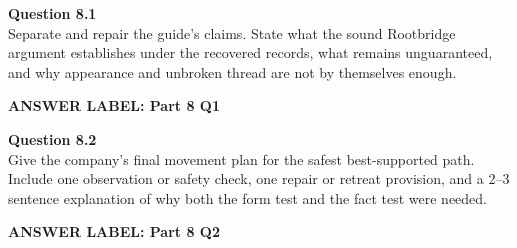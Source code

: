 \documentclass[12pt]{article}
\newcommand{\answerbox}[2]{\par\vspace{0.1em}\noindent\textbf{#1}\par\vspace{0.03em}\noindent\fbox{\begin{minipage}[t][#2]{\dimexpr\textwidth-2\fboxsep-2\fboxrule}\rule{\textwidth}{0pt}\vspace{#2}\end{minipage}}\par\vspace{0.18em}}
\begin{document}
\textbf{Question 8.1}\\[-0.15em]
Separate and repair the guide's claims. State what the sound Rootbridge argument establishes under the recovered records, what remains unguaranteed, and why appearance and unbroken thread are not by themselves enough.
\answerbox{ANSWER LABEL: Part 8 Q1}{2.0in}

\textbf{Question 8.2}\\[-0.15em]
Give the company's final movement plan for the safest best-supported path. Include one observation or safety check, one repair or retreat provision, and a 2--3 sentence explanation of why both the form test and the fact test were needed.
\answerbox{ANSWER LABEL: Part 8 Q2}{2.0in}
\end{document}

